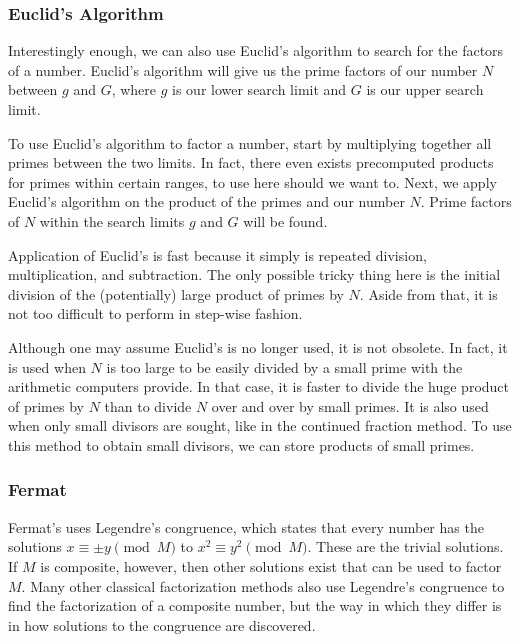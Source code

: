 \documentclass{article}
\begin{document}
\subsubsection*{ Euclid's Algorithm }
\par Interestingly enough, we can also use Euclid's algorithm to search for the factors of a
number. Euclid's algorithm will give us the prime factors of our number $N$ between $g$ and $G$, where
$g$ is our lower search limit and $G$ is our upper search limit.

\par To use Euclid's algorithm to factor a number, start by multiplying together all primes between
the two limits. In fact, there even exists precomputed products for primes within certain ranges, to
use here should we want to. Next, we apply Euclid's algorithm on the product of the primes and our number
$N$. Prime factors of $N$ within the search limits $g$ and $G$ will be found.

\par Application of Euclid's is fast because it simply is repeated division, multiplication, and
subtraction. The only possible tricky thing here is the initial division of the (potentially) large product
of primes by $N$. Aside from that, it is not too difficult to perform in step-wise fashion.

\par Although one may assume Euclid's is no longer used, it is not obsolete. In fact, it is used when $N$ is
too large to be easily divided by a small prime with the arithmetic computers provide. In that case, it
is faster to divide the huge product of primes by $N$ than to divide $N$ over and over by small primes.
It is also used when only small divisors are sought, like in the continued fraction method. To use this method
to obtain small divisors, we can store products of small primes.


\subsubsection*{ Fermat }
\par Fermat's uses Legendre's congruence, which states that every number has the solutions
$x \equiv \pm y \pmod{M}$ to $x^2 \equiv y^2 \pmod{M}$.  These are the trivial solutions. If $M$ is composite,
however, then other solutions exist that can be used to factor $M$. Many other classical factorization methods
also use Legendre's congruence to find the factorization of a composite number, but the way in which they differ
is in how solutions to the congruence are discovered.
\end{document}
